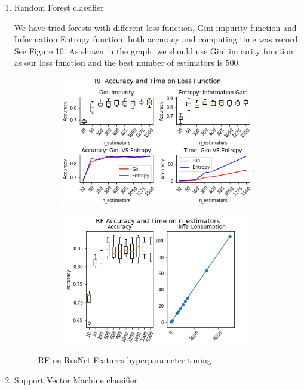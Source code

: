 \documentclass[11.5pt]{article}
\begin{document}
\begin{enumerate}
\begin{itemize}
\begin{enumerate}
                \item Random Forest classifier

                We have tried forests with different loss function, Gini impurity function and Information Entropy function, both accuracy and computing time was record. See Figure 10. As shown in the graph, we should use Gini impurity function as our loss function and the best number of estimators is $500$.

                \begin{figure}[h!]
                    \begin{subfigure}[b]{0.5\linewidth}
                        \centering
                        \includegraphics[width=0.7\linewidth]{images/res_tradi_RF_penalty.png}
                    \end{subfigure}
                    \begin{subfigure}[b]{0.5\linewidth}
                        \centering
                        \includegraphics[width=0.7\linewidth]{images/res_tradi_RF_n_estimators.png}
                    \end{subfigure}
                    \caption{RF on ResNet Features hyperparameter tuning}
                \end{figure}

                \item Support Vector Machine classifier
                

\end{enumerate}
\end{itemize}
\end{enumerate}
\end{document}
